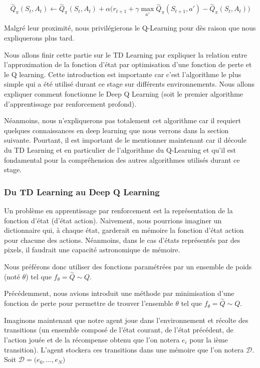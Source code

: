 \begin{equation}\label{eq:qlearning}
\overset{\sim}{Q}_{\pi}(S_t, A_t) \leftarrow \overset{\sim}{Q}_{\pi}(S_t, A_t) + \alpha \bigg(r_{t+1} + \gamma \underset{a'}{\max}\overset{\sim}{Q}_{\pi}(S_{t+1}, a') - \overset{\sim}{Q}_{\pi}(S_t, A_t)\bigg)
\end{equation}

Malgré leur proximité, nous privilégierons le Q-Learning pour dès raison que nous expliquerons plus tard.

Nous allons finir cette partie sur le TD Learning par expliquer la relation entre l'approximation de la fonction d'état par optimisation d'une fonction de perte et le Q learning. Cette introduction est importante car c'est l'algorithme le plus simple qui a été utilisé durant ce stage sur différents environnements. Nous allons expliquer comment fonctionne le Deep Q Learning \cite{2013arXiv1312.5602M} \cite{mnih-dqn-2015} (soit le premier algorithme d'apprentissage par renforcement profond). 

Néanmoins, nous n'expliquerons pas totalement cet algorithme car il requiert quelques connaissances en deep learning que nous verrons dans la section suivante. Pourtant, il est important de le mentionner maintenant car il découle du TD Learning et en particulier de l'algorithme du Q-Learning et qu'il est fondamental pour la compréhension des autres algorithmes utilisés durant ce stage.

\subsubsection{Du TD Learning au Deep Q Learning}

Un problème en apprentissage par renforcement est la représentation de la fonction d'état (d'état action). Naivement, nous pourrions imaginer un dictionnaire qui, à chaque état, garderait en mémoire la fonction d'état action pour chacune des actions. Néanmoins, dans le cas d'états représentés par des pixels, il faudrait une capacité astronomique de mémoire. 

Nous préférons donc utiliser des fonctions paramétrées par un ensemble de poids (noté $\theta$) tel que $f_\theta = \overset{\sim}{Q} \sim Q$. 

Précédemment, nous avions introduit une méthode par minimisation d'une fonction de perte pour permettre de trouver l'ensemble $\theta$ tel que $f_\theta = \overset{\sim}{Q} \sim Q$. 

Imaginons maintenant que notre agent joue dans l'environnement et récolte des transitions (un ensemble composé de l'état courant, de l'état précédent, de l'action jouée et de la récompense obtenu que l'on notera $e_i$ pour la ième transition). L'agent stockera ces transitions dans une mémoire que l'on notera $\mathcal{D}$. Soit $\mathcal{D} = \big(e_0, ..., e_N\big)$ 

